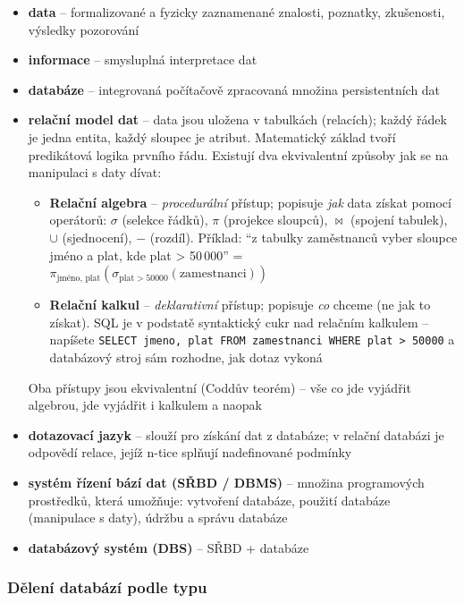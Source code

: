 \begin{itemize}
  \item \textbf{data} -- formalizované a fyzicky zaznamenané znalosti, poznatky, zkušenosti, výsledky pozorování
  \item \textbf{informace} -- smysluplná interpretace dat
  \item \textbf{databáze} -- integrovaná počítačově zpracovaná množina persistentních dat
  \item \textbf{relační model dat} -- data jsou uložena v tabulkách (relacích); každý řádek je jedna
    entita, každý sloupec je atribut. Matematický základ tvoří predikátová logika prvního řádu.
    Existují dva ekvivalentní způsoby jak se na manipulaci s daty dívat:
    \begin{itemize}
      \item \textbf{Relační algebra} -- \textit{procedurální} přístup; popisuje \textit{jak} data získat pomocí
        operátorů: $\sigma$ (selekce řádků), $\pi$ (projekce sloupců), $\bowtie$ (spojení tabulek),
        $\cup$ (sjednocení), $-$ (rozdíl). Příklad: ``z tabulky zaměstnanců vyber sloupce jméno a plat,
        kde plat > 50\,000'' = $\pi_{\text{jméno, plat}}(\sigma_{\text{plat}>50000}(\text{zamestnanci}))$
      \item \textbf{Relační kalkul} -- \textit{deklarativní} přístup; popisuje \textit{co} chceme
        (ne jak to získat). SQL je v podstatě syntaktický cukr nad relačním kalkulem -- napíšete
        \texttt{SELECT jmeno, plat FROM zamestnanci WHERE plat > 50000} a databázový stroj sám
        rozhodne, jak dotaz vykoná
    \end{itemize}
    Oba přístupy jsou ekvivalentní (Coddův teorém) -- vše co jde vyjádřit algebrou, jde vyjádřit
    i kalkulem a naopak
  \item \textbf{dotazovací jazyk} -- slouží pro získání dat z databáze; v relační databázi je odpovědí relace,
    jejíž n-tice splňují nadefinované podmínky
  \item \textbf{systém řízení bází dat (SŘBD / DBMS)} -- množina programových prostředků, která umožňuje:
    vytvoření databáze, použití databáze (manipulace s daty), údržbu a správu databáze
  \item \textbf{databázový systém (DBS)} -- SŘBD + databáze
\end{itemize}

\subsubsection*{Dělení databází podle typu}

